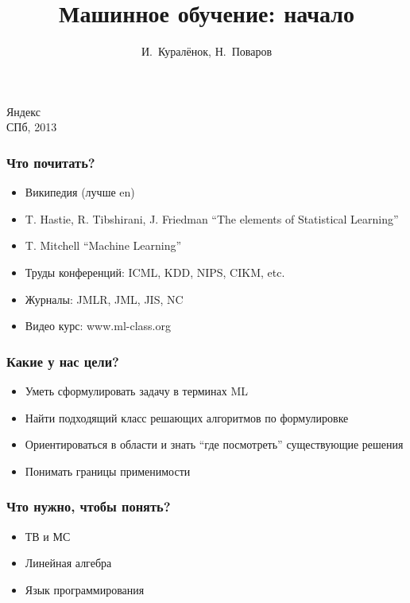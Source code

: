 \documentclass[14pt, fleqn, xcolor={dvipsnames, table}]{beamer}
\title{Машинное обучение: начало\\\small{}}
\author[]{\small{%
И.~Куралёнок,
Н.~Поваров}}
\date{}
\begin{document}
\begin{frame}
\maketitle
\small
\begin{center}
\vspace{-60pt}
\normalsize {\color{red}Я}ндекс \\
\vspace{80pt}
\footnotesize СПб, 2013
\end{center}
\end{frame}

\begin{frame}
\frametitle{Что почитать?}
\begin{itemize}
  \item Википедия (лучше en)
\end{itemize}
\begin{itemize}
  \item T. Hastie, R. Tibshirani, J. Friedman “The elements of Statistical Learning”
  \item T. Mitchell “Machine Learning”
\end{itemize}
\begin{itemize}
  \item Труды конференций: ICML, KDD, NIPS, CIKM, etc.
  \item Журналы: JMLR, JML, JIS, NC
  \item Видео курс: www.ml-class.org
\end{itemize}
\end{frame}

\begin{frame}
\frametitle{Какие у нас цели?}
\begin{itemize}
	\item Уметь сформулировать задачу в терминах ML
	\item Найти подходящий класс решающих алгоритмов по формулировке
	\item Ориентироваться в области и знать ``где посмотреть'' существующие решения
	\item Понимать границы применимости
\end{itemize}
\end{frame}

\begin{frame}
\frametitle{Что нужно, чтобы понять?}
\begin{itemize}
	\item ТВ и МС
	\item Линейная алгебра
	\item Язык программирования
\end{itemize}
\end{frame}
\end{document}
